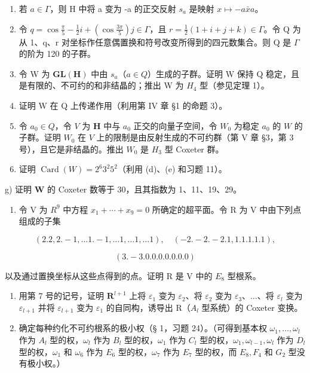 \begin{enumerate}
\def\labelenumi{\alph{enumi})}
\item
  若 \(a \in \Gamma\)，则 H 中将 a 变为 -a 的正交反射 \(s_{a}\) 是映射 \(x \mapsto -a\bar{x}a\)。
\item
  令 \(q = \cos \frac{\pi}{5} - \frac{1}{2}i + (\cos \frac{3\pi}{5})j \in \Gamma\)，且 \(r = \frac{1}{2}(1 + i + j + k) \in \Gamma\)。令 Q 为从 1、q、r 对坐标作任意偶置换和符号改变所得到的四元数集合。则 Q 是 \(\Gamma\) 的阶为 120 的子群。
\item
  令 W 为 \(\mathbf{GL}(\mathbf{H})\) 中由 \(s_{a}\)（\(a \in Q\)）生成的子群。证明 W 保持 Q 稳定，且是有限的、不可约的和非结晶的；推出 W 为 \(H_{4}\) 型（参见定理 1）。
\item
  证明 W 在 Q 上传递作用（利用第 IV 章 §1 的命题 3）。
\item
  令 \(a_0 \in Q\)，令 \(V\) 为 \(\mathbf{H}\) 中与 \(a_0\) 正交的向量子空间，令 \(W_0\) 为稳定 \(a_0\) 的 \(W\) 的子群。证明 \(W_0\) 在 \(V\) 上的限制是由反射生成的不可约群（第 V 章 §3，第 3 号），且它是非结晶的。推出 \(W_0\) 是 \(H_3\) 型 Coxeter 群。
\item
  证明 \(\operatorname{Card}(W)=2^{6}3^{2}5^{2}\)（利用 (d)、(e) 和习题 11）。
\end{enumerate}

g) 证明 \(\mathbf{W}\) 的 Coxeter 数等于 30，且其指数为 1、11、19、29。

\begin{enumerate}
\def\labelenumi{\arabic{enumi})}
\setcounter{enumi}{12}
\tightlist
\item
  令 V 为 \(R^{9}\) 中方程 \(x_{1} + \cdots + x_{9} = 0\) 所确定的超平面。令 R 为 V 中由下列点组成的子集
\end{enumerate}

\[
(2. 2, 2. - 1, \dots 1. - 1, \dots 1, \dots 1, \dots 1), \quad (- 2. - 2. - 2. 1, 1. 1. 1. 1. 1),
\]

\[
(3. - 3. 0. 0. 0. 0. 0. 0. 0)
\]

以及通过置换坐标从这些点得到的点。证明 R 是 V 中的 \(E_{8}\) 型根系。

\begin{enumerate}
\def\labelenumi{\arabic{enumi})}
\setcounter{enumi}{13}
\item
  用第 7 号的记号，证明 \(\mathbf{R}^{l+1}\) 上将 \(\varepsilon_1\) 变为 \(\varepsilon_2\)、将 \(\varepsilon_2\) 变为 \(\varepsilon_3\)、\(\ldots\)、将 \(\varepsilon_l\) 变为 \(\varepsilon_{l+1}\) 并将 \(\varepsilon_{l+1}\) 变为 \(\varepsilon_1\) 的自同构，诱导出 R（\(A_l\) 型系统）的 Coxeter 变换。
\item
  确定每种约化不可约根系的极小权（§ 1，习题 24）。（可得到基本权 \(\omega_{1},\ldots,\omega_{l}\) 作为 \(A_{l}\) 型的权，\(\omega_{l}\) 作为 \(B_{l}\) 型的权，\(\omega_{1}\) 作为 \(C_{l}\) 型的权，\(\omega_{1},\omega_{l-1},\omega_{l}\) 作为 \(D_{l}\) 型的权，\(\omega_{1}\) 和 \(\omega_{6}\) 作为 \(E_{6}\) 型的权，\(\omega_{7}\) 作为 \(E_{7}\) 型的权，而 \(E_{8},F_{4}\) 和 \(G_{2}\) 型没有极小权。）
\end{enumerate}

